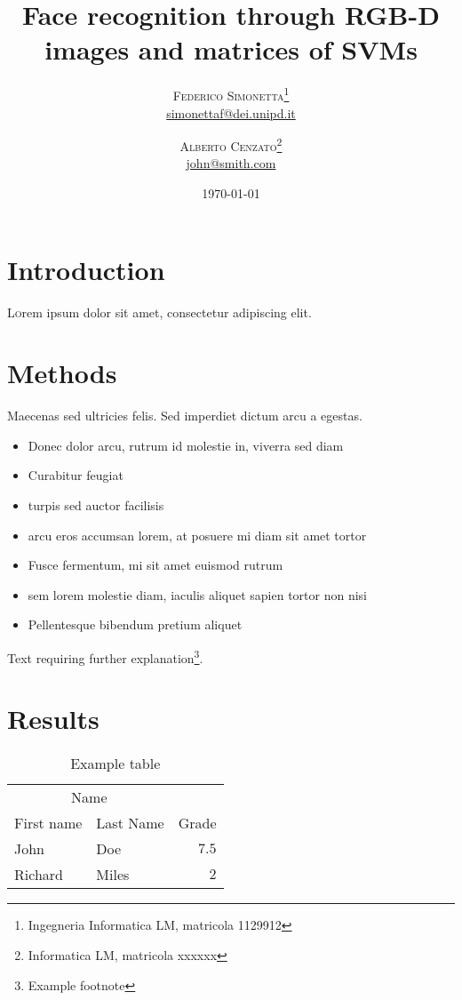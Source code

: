 \documentclass[twoside,twocolumn]{article}
\title{Face recognition through RGB-D images and matrices of SVMs} %
\author{%
		\textsc{Federico Simonetta}\thanks{Ingegneria Informatica LM, matricola 1129912} \\[1ex] %
		\normalsize \href{mailto:simonettaf@dei.unipd.it}{simonettaf@dei.unipd.it} %
		\and %
		\textsc{Alberto Cenzato}\thanks{Informatica LM, matricola xxxxxx} \\[1ex] %
		\normalsize \href{mailto:john@smith.com}{john@smith.com} %
	}
\date{\today} %
\begin{document}
	\maketitle


	\section{Introduction}

	\lettrine[nindent=0em,lines=3]{L} orem ipsum dolor sit amet, consectetur adipiscing elit.
	\blindtext %

	\blindtext %


	\section{Methods}

	Maecenas sed ultricies felis. Sed imperdiet dictum arcu a egestas.
	\begin{itemize}
		\item Donec dolor arcu, rutrum id molestie in, viverra sed diam
		\item Curabitur feugiat
		\item turpis sed auctor facilisis
		\item arcu eros accumsan lorem, at posuere mi diam sit amet tortor
		\item Fusce fermentum, mi sit amet euismod rutrum
		\item sem lorem molestie diam, iaculis aliquet sapien tortor non nisi
		\item Pellentesque bibendum pretium aliquet
	\end{itemize}
	\blindtext %

	Text requiring further explanation\footnote{Example footnote}.


	\section{Results}

	\begin{table}
		\caption{Example table}
		\centering
		\begin{tabular}{llr}
			\toprule
			\multicolumn{2}{c}{Name} \\
			\cmidrule(r){1-2}
			First name & Last Name & Grade \\
			\midrule
			John & Doe & $7.5$ \\
			Richard & Miles & $2$ \\
			\bottomrule
		\end{tabular}
	\end{table}
\end{document}
